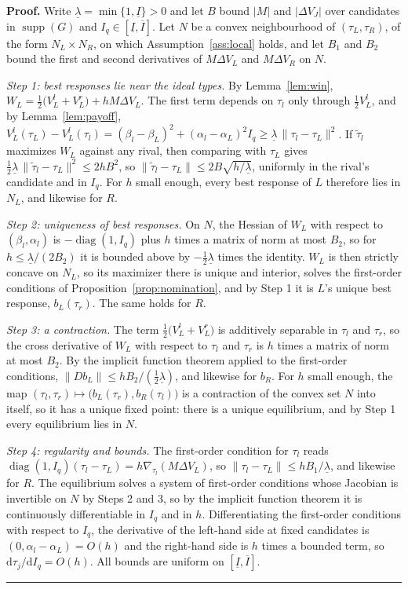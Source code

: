 \documentclass[12pt,letterpaper]{article}
\newenvironment{proof}[1][Proof]{\noindent\textbf{#1.} }{\ \rule{0.5em}{0.5em}}
\begin{document}
\begin{proof}
Write $\underline\lambda=\min\{1,\underline I\}>0$ and let $B$ bound $|M|$ and $|\Delta V_J|$ over candidates in $\operatorname{supp}(G)$ and $I_q\in[\underline I,\overline I]$. Let $N$ be a convex neighbourhood of $(\tau_L,\tau_R)$, of the form $N_L\times N_R$, on which Assumption~\ref{ass:local} holds, and let $B_1$ and $B_2$ bound the first and second derivatives of $M\Delta V_L$ and $M\Delta V_R$ on $N$.

\emph{Step 1: best responses lie near the ideal types.} By Lemma~\ref{lem:win}, $W_L=\tfrac12\big(V_L^l+V_L^r\big)+hM\Delta V_L$. The first term depends on $\tau_l$ only through $\tfrac12V_L^l$, and by Lemma~\ref{lem:payoff}, $V_L^l(\tau_L)-V_L^l(\tau_l)=(\beta_l-\beta_L)^2+(\alpha_l-\alpha_L)^2I_q\ge\underline\lambda\,\|\tau_l-\tau_L\|^2$. If $\tilde\tau_l$ maximizes $W_L$ against any rival, then comparing with $\tau_L$ gives $\tfrac12\underline\lambda\,\|\tilde\tau_l-\tau_L\|^2\le2hB^2$, so $\|\tilde\tau_l-\tau_L\|\le2B\sqrt{h/\underline\lambda}$, uniformly in the rival's candidate and in $I_q$. For $h$ small enough, every best response of $L$ therefore lies in $N_L$, and likewise for $R$.

\emph{Step 2: uniqueness of best responses.} On $N$, the Hessian of $W_L$ with respect to $(\beta_l,\alpha_l)$ is $-\operatorname{diag}(1,I_q)$ plus $h$ times a matrix of norm at most $B_2$, so for $h\le\underline\lambda/(2B_2)$ it is bounded above by $-\tfrac12\underline\lambda$ times the identity. $W_L$ is then strictly concave on $N_L$, so its maximizer there is unique and interior, solves the first-order conditions of Proposition~\ref{prop:nomination}, and by Step 1 it is $L$'s unique best response, $b_L(\tau_r)$. The same holds for $R$.

\emph{Step 3: a contraction.} The term $\tfrac12\big(V_L^l+V_L^r\big)$ is additively separable in $\tau_l$ and $\tau_r$, so the cross derivative of $W_L$ with respect to $\tau_l$ and $\tau_r$ is $h$ times a matrix of norm at most $B_2$. By the implicit function theorem applied to the first-order conditions, $\|Db_L\|\le hB_2/(\tfrac12\underline\lambda)$, and likewise for $b_R$. For $h$ small enough, the map $(\tau_l,\tau_r)\mapsto\big(b_L(\tau_r),b_R(\tau_l)\big)$ is a contraction of the convex set $N$ into itself, so it has a unique fixed point: there is a unique equilibrium, and by Step 1 every equilibrium lies in $N$.

\emph{Step 4: regularity and bounds.} The first-order condition for $\tau_l$ reads $\operatorname{diag}(1,I_q)(\tau_l-\tau_L)=h\nabla_{\tau_l}(M\Delta V_L)$, so $\|\tau_l-\tau_L\|\le hB_1/\underline\lambda$, and likewise for $R$. The equilibrium solves a system of first-order conditions whose Jacobian is invertible on $N$ by Steps 2 and 3, so by the implicit function theorem it is continuously differentiable in $I_q$ and in $h$. Differentiating the first-order conditions with respect to $I_q$, the derivative of the left-hand side at fixed candidates is $(0,\alpha_l-\alpha_L)=O(h)$ and the right-hand side is $h$ times a bounded term, so $\mathrm{d}\tau_j/\mathrm{d}I_q=O(h)$. All bounds are uniform on $[\underline I,\overline I]$.
\end{proof}
\end{document}
